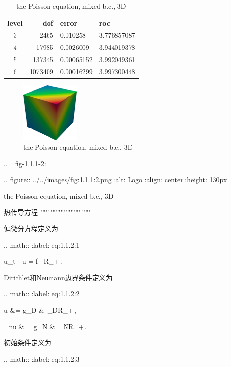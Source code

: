 \begin{table}[!htbp]\label{tab:4.1.1:2}
  \centering
  \begin{tabular}{c|r|l|l}
    level    &      dof   &         error  &         roc \\
    \hline
    3      &        2465  &         0.010258    &    3.776857087 \\
    \hline
    4      &        17985 &         0.0026009  &     3.944019378 \\
    \hline
    5      &        137345   &      0.00065152  &    3.992049361 \\
    \hline
   6      &        1073409   &     0.00016299  &    3.997300448
  \end{tabular}
  \caption{the Poisson equation, mixed b.c., 3D}
\end{table}

\begin{figure}[!htbp]
  \centering
  \includegraphics[height=3cm]{fig/4/fig:1.1.1:2.png}
  \caption{the Poisson equation, mixed b.c., 3D}
  \label{fig:4.1.1:2}
\end{figure}

\iffalse
.. _fig-1.1.1-2:

.. figure:: ../../images/fig:1.1.1:2.png
   :alt: Logo
   :align: center
   :height: 130px

   the Poisson equation, mixed b.c., 3D


热传导方程
""""""""""""""""""""

偏微分方程定义为

.. math::
   :label: eq:1.1.2:1

   u_t - \Delta u = f \qquad {}\ \Omega\times\mathrm R_+\,.

Dirichlet和Neumann边界条件定义为
   
.. math::
   :label: eq:1.1.2:2
		   
   u &= g_{\mathrm D} &\ \Gamma_{\mathrm D}\times\mathrm R_+\,,
	  
   \partial_{\mathbf n}u & = g_{\mathrm N} &\ \Gamma_{\mathrm N}\times\mathrm R_+\,.

初始条件定义为

.. math::
   :label: eq:1.1.2:3
		   
